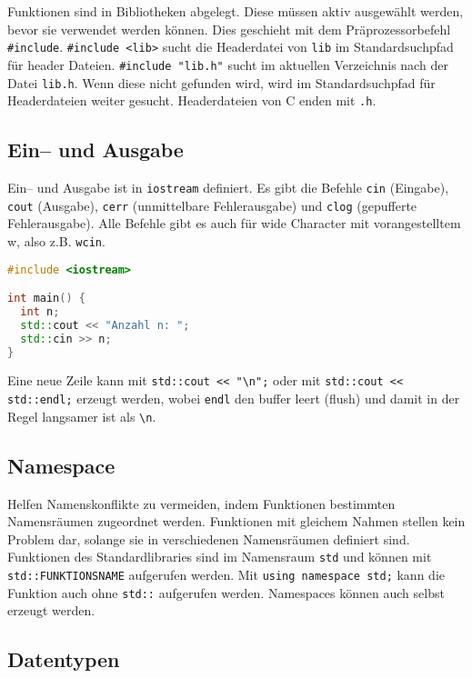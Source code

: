 Funktionen sind in Bibliotheken abgelegt. Diese müssen aktiv ausgewählt werden,
bevor sie verwendet werden können. Dies geschieht mit dem Präprozessorbefehl
\lstinline|#include|. \lstinline|#include <lib>| sucht die Headerdatei von
\lstinline|lib| im Standardsuchpfad für header Dateien.
\lstinline|#include "lib.h"| sucht im aktuellen Verzeichnis nach der Datei
\lstinline|lib.h|. Wenn diese nicht gefunden wird, wird im Standardsuchpfad für
Headerdateien weiter gesucht. Headerdateien von C enden mit \lstinline|.h|.

\subsection{Ein-- und Ausgabe}

Ein-- und Ausgabe ist in \lstinline|iostream| definiert. Es gibt die Befehle
\lstinline|cin| (Eingabe), \lstinline|cout| (Ausgabe), \lstinline|cerr|
(unmittelbare Fehlerausgabe) und \lstinline|clog| (gepufferte Fehlerausgabe).
Alle Befehle gibt es auch für wide Character mit vorangestelltem w, also z.B.
\lstinline|wcin|.

\begin{lstlisting}[language=C++]
#include <iostream>

int main() {
  int n;
  std::cout << "Anzahl n: ";
  std::cin >> n;
}
\end{lstlisting}

Eine neue Zeile kann mit \lstinline|std::cout << "\n";| oder mit
\lstinline|std::cout << std::endl;| erzeugt werden, wobei \lstinline|endl| den
buffer leert (flush) und damit in der Regel langsamer ist als \lstinline|\n|.

\subsection{Namespace}

Helfen Namenskonflikte zu vermeiden, indem Funktionen bestimmten Namensräumen
zugeordnet werden. Funktionen mit gleichem Nahmen stellen kein Problem dar,
solange sie in verschiedenen Namensräumen definiert sind. Funktionen des
Standardlibraries sind im Namensraum \lstinline|std| und können mit
\lstinline|std::FUNKTIONSNAME| aufgerufen werden. Mit
\lstinline|using namespace std;| kann die Funktion auch ohne \lstinline|std::|
aufgerufen werden. Namespaces können auch selbst erzeugt werden.

\subsection{Datentypen}


